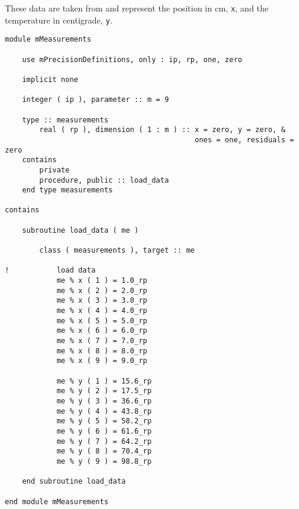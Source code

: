 These data are taken from \cite[Table 6-1]{Bevington} and represent the position in cm, \texttt{x}, and the temperature in centigrade, \texttt{y}.
\begin{lstlisting}
module mMeasurements

    use mPrecisionDefinitions, only : ip, rp, one, zero

    implicit none

    integer ( ip ), parameter :: m = 9

    type :: measurements
        real ( rp ), dimension ( 1 : m ) :: x = zero, y = zero, &
                                            ones = one, residuals = zero
    contains
        private
        procedure, public :: load_data
    end type measurements

contains

    subroutine load_data ( me )

        class ( measurements ), target :: me

!           load data
            me % x ( 1 ) = 1.0_rp
            me % x ( 2 ) = 2.0_rp
            me % x ( 3 ) = 3.0_rp
            me % x ( 4 ) = 4.0_rp
            me % x ( 5 ) = 5.0_rp
            me % x ( 6 ) = 6.0_rp
            me % x ( 7 ) = 7.0_rp
            me % x ( 8 ) = 8.0_rp
            me % x ( 9 ) = 9.0_rp

            me % y ( 1 ) = 15.6_rp
            me % y ( 2 ) = 17.5_rp
            me % y ( 3 ) = 36.6_rp
            me % y ( 4 ) = 43.8_rp
            me % y ( 5 ) = 58.2_rp
            me % y ( 6 ) = 61.6_rp
            me % y ( 7 ) = 64.2_rp
            me % y ( 8 ) = 70.4_rp
            me % y ( 9 ) = 98.8_rp

    end subroutine load_data

end module mMeasurements
\end{lstlisting}

